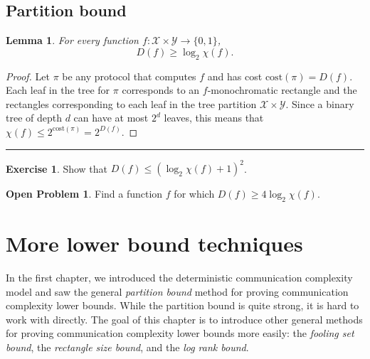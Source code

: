 \documentclass[11pt,oneside]{book}
\theoremstyle{plain}
\newtheorem{lemma}{Lemma}
\theoremstyle{definition}
\newtheorem{exercise}{Exercise}
\newtheorem{open}{Open Problem}
\theoremstyle{plain}
\newcommand{\cost}{\mathrm{cost}}
\newcommand{\exercises}{\bigskip \noindent\rule{8cm}{0.4pt} \medskip}
\begin{document}
\section{Partition bound}

\begin{lemma}
	For every function $f : \mathcal{X} \times \mathcal{Y} \to \{0,1\}$, 
	\[
	D(f) \ge \log_2 \chi(f).
	\]
\end{lemma}

\begin{proof}
	Let $\pi$ be any protocol that computes $f$ and has cost $\cost(\pi) = D(f)$. Each leaf in the tree for $\pi$ corresponds to an $f$-monochromatic rectangle and the rectangles corresponding to each leaf in the tree partition $\mathcal{X} \times \mathcal{Y}$. Since a binary tree of depth $d$ can have at most $2^d$ leaves, this means that $\chi(f) \le 2^{\cost(\pi)} = 2^{D(f)}$. 
\end{proof}

\exercises

\begin{exercise} %
	Show that $D(f) \le (\log_2 \chi(f) + 1)^2$.
\end{exercise}

\begin{open}
	Find a function $f$ for which $D(f) \ge 4 \log_2 \chi(f)$.
\end{open}
	

\chapter[CH02]{More lower bound techniques}

In the first chapter, we introduced the deterministic communication complexity 
model and saw the general \emph{partition bound} method for proving communication complexity lower bounds. While the partition bound is quite strong, it is hard to work with directly. The goal of this chapter is to introduce other general methods for proving communication complexity lower bounds more easily: the \emph{fooling set bound}, the \emph{rectangle size bound}, and the \emph{log rank bound}.
\end{document}
